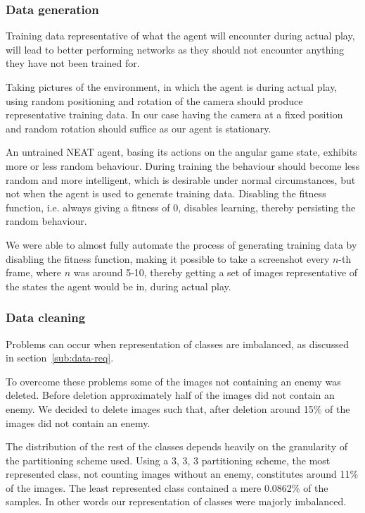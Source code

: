 \subsubsection{Data generation}
\label{subsub:data-gen}
Training data representative of what the agent will encounter during actual play, will lead to better performing networks as they should not encounter anything they have not been trained for.

Taking pictures of the environment, in which the agent is during actual play, using random positioning and rotation of the camera should produce representative training data. In our case having the camera at a fixed position and random rotation should suffice as our agent is stationary.

An untrained NEAT agent, basing its actions on the angular game state, exhibits more or less random behaviour. During training the behaviour should become less random and more intelligent, which is desirable under normal circumstances, but not when the agent is used to generate training data. Disabling the fitness function, i.e. always giving a fitness of 0, disables learning, thereby persisting the random behaviour.

We were able to almost fully automate the process of generating training data by disabling the fitness function, making it possible to take a screenshot every $n$-th frame, where $n$ was around 5-10,  thereby getting a set of images representative of the states the agent would be in, during actual play.


\subsubsection{Data cleaning}
Problems can occur when representation of classes are imbalanced, as discussed in section~\ref{sub:data-req}.

To overcome these problems some of the images not containing an enemy was deleted. Before deletion approximately half of the images did not contain an enemy. We decided to delete images such that, after deletion around 15\% of the images did not contain an enemy.

The distribution of the rest of the classes depends heavily on the granularity of the partitioning scheme used. Using a 3, 3, 3 partitioning scheme, the most represented class, not counting images without an enemy, constitutes around 11\% of the images. The least represented class contained a mere 0.0862\% of the samples. In other words our representation of classes were majorly imbalanced.

